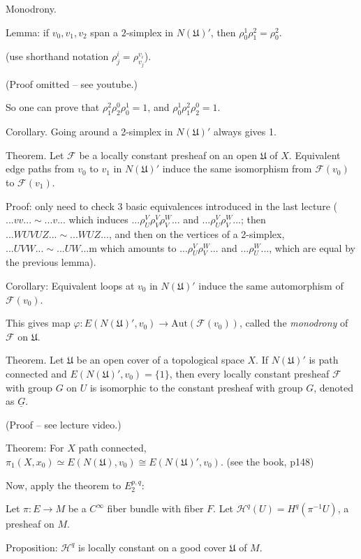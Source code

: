\documentclass{article}
\theoremstyle{mystyle}
\theoremstyle{remark}
\numberwithin{equation}{section}
\begin{document}
Monodrony.

Lemma: if $v_0,v_1,v_2$ span a $2$-simplex in $N(\mathfrak{U})'$, then $\rho_0^1\rho_1^2 = \rho_0^2$. 

(use shorthand notation $\rho^i_j = \rho^{v_i}_{v_j}$).

(Proof omitted -- see youtube.)

So one can prove that $\rho^2_1\rho^0_2\rho^1_0=1$, and $\rho^1_0\rho^2_1\rho^0_2=1$.

Corollary. Going around a 2-simplex in $N(\mathfrak{U})'$ always gives 1. 

Theorem. Let $\mathcal{F}$ be a locally constant presheaf on an open $\mathfrak{U}$ of $X$. Equivalent edge paths from $v_0$ to $v_1$ in $N(\mathfrak{U})'$ induce the same isomorphism from $\mathcal{F}(v_0)$ to $\mathcal{F}(v_1)$. 

Proof: only need to check 3 basic equivalences introduced in the last lecture ($...vv...\sim ...v...$ which induces $...\rho^V_U\rho^V_V\rho^W_V...$ and $...\rho^V_U\rho^W_V...$; then $...WUVUZ...\sim ...WUZ...$, and then on the vertices of a 2-simplex, $...UVW...\sim ...UW...$m which amounts to $...\rho^V_U\rho^W_V...$ and $...\rho^W_U...$, which are equal by the previous lemma).

Corollary: Equivalent loops at $v_0$ in $N(\mathfrak{U})'$ induce the same automorphism of $\mathcal{F}(v_0)$. 

This gives map $\varphi\colon E(N(\mathfrak{U})',v_0)\rightarrow \mathrm{Aut}(\mathcal{F}(v_0))$, called the \emph{monodrony} of $\mathcal{F}$ on $\mathfrak{U}$. 

Theorem. Let $\mathfrak{U}$ be an open cover of a topological space $X$. If $N(\mathfrak{U})'$ is path connected and $E(N(\mathfrak{U})',v_0) = \{1\}$, then every locally constant presheaf $\mathcal{F}$ with group $G$ on $U$ is isomorphic to the constant presheaf with group $G$, denoted as $\underline{G}$.
	
(Proof -- see lecture video.)
	
Theorem: For $X$ path connected, $\pi_1(X,x_0)\simeq E(N(\mathfrak{U}),v_0)
\cong E(N(\mathfrak{U})',v_0)$.  (see the book, p148)
	
Now, apply the theorem to $E_2^{p,q}$:

Let $\pi\colon E\rightarrow M$ be a $C^\infty$ fiber bundle with fiber $F$. Let $\mathcal{H}^q(U) = H^q(\pi^{-1}U)$, a presheaf on $M$.

Proposition: $\mathcal{H}^q$ is locally constant on a good cover $\mathfrak{U}$ of $M$. 
\end{document}
